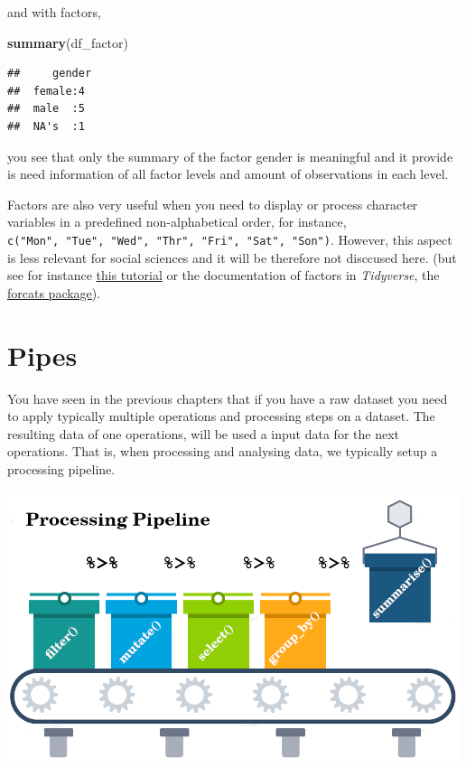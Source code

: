 \documentclass[
]{scrartcl}
\makeatletter
\newenvironment{Shaded}{\begin{snugshade}}{\end{snugshade}}
\newcommand{\KeywordTok}[1]{\textcolor[rgb]{0.13,0.29,0.53}{\textbf{#1}}}
\newcommand{\NormalTok}[1]{#1}
\newenvironment{kframe}{%
\medskip{}
\setlength{\fboxsep}{.8em}
 \def\at@end@of@kframe{}%
 \ifinner\ifhmode%
  \def\at@end@of@kframe{\end{minipage}}%
  \begin{minipage}{\columnwidth}%
 \fi\fi%
 \def\FrameCommand##1{\hskip\@totalleftmargin \hskip-\fboxsep
 \colorbox{shadecolor}{##1}\hskip-\fboxsep
     \hskip-\linewidth \hskip-\@totalleftmargin \hskip\columnwidth}%
 \MakeFramed {\advance\hsize-\width
   \@totalleftmargin\z@ \linewidth\hsize
   \@setminipage}}%
 {\par\unskip\endMakeFramed%
 \at@end@of@kframe}
\newenvironment{rmdblock}[1]
  {
  \begin{itemize}
  \renewcommand{\labelitemi}{
    \raisebox{-.7\height}[0pt][0pt]{
      {\setkeys{Gin}{width=3em,keepaspectratio}\texttt{[image: images/\#1]}}
    }
  }
  \setlength{\fboxsep}{1em}
  \begin{kframe}
  \item
  }
  {
  \end{kframe}
  \end{itemize}
  }
\newenvironment{geek}
    {\begin{rmdblock}{geek}}
    {\end{rmdblock}}
\makeatother
\begin{document}
and with factors,

\begin{Shaded}
\begin{Highlighting}[]
\KeywordTok{summary}\NormalTok{(df\_factor)}
\end{Highlighting}
\end{Shaded}

\begin{verbatim}
##     gender 
##  female:4  
##  male  :5  
##  NA's  :1
\end{verbatim}

you see that only the summary of the factor gender is meaningful and it provide is need information of all factor levels and amount of observations in each level.

\begin{geek}
Factors are also very useful when you need to display or process
character variables in a predefined non-alphabetical order, for
instance,
\texttt{c("Mon",\ "Tue",\ "Wed",\ "Thr",\ "Fri",\ "Sat",\ "Son")}.
However, this aspect is less relevant for social sciences and it will be
therefore not disccused here. (but see for instance
\href{https://r4ds.had.co.nz/factors.html\#introduction-9}{this
tutorial} or the documentation of factors in \emph{Tidyverse}, the
\href{https://forcats.tidyverse.org/}{forcats package}).
\end{geek}

\hypertarget{pipes}{%
\section{Pipes}\label{pipes}}

You have seen in the previous chapters that if you have a raw dataset you need to apply typically multiple operations and processing steps on a dataset. The resulting data of one operations, will be used a input data for the next operations. That is, when processing and analysing data, we typically setup a processing pipeline.

\begin{center}\includegraphics[width=500px]{images/pipeline} \end{center}
\end{document}
